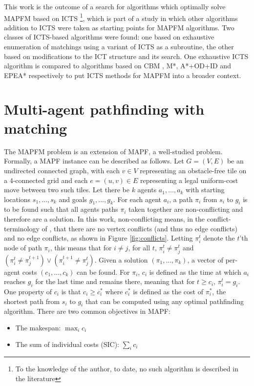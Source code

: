 \documentclass[english,10pt]{article}
\begin{document}
	This work is the outcome of a search for algorithms which optimally solve MAPFM based on ICTS \footnote{To the knowledge of the author, to date, no such algorithm is described in the literature}, which is part of a study in which other algorithms addition to ICTS were taken as starting points for MAPFM algorithms. Two classes of ICTS-based algorithms were found: one based on exhaustive enumeration of matchings using a variant of ICTS as a subroutine, the other based on modifications to the ICT structure and its search. One exhaustive ICTS algorithm is compared to algorithms based on CBM \cite{ma2016}, M*\cite{wagner2011}, A*+OD+ID\cite{standley2010} and EPEA*\cite{goldenberg2014} respectively to put ICTS methods for MAPFM into a broader context.
	
	\section{Multi-agent pathfinding with matching} %
	\label{mapfm}
	The MAPFM problem is an extension of MAPF, a well-studied problem. Formally, a MAPF instance can be described as follows. Let $G = (V,E)$ be an undirected connected graph, with each $v\in V$ representing an obstacle-free tile on a 4-connected grid and each $e = (u,v)\in E$ representing a legal uniform-cost move between two such tiles. Let there be $k$ agents $a_1,\ldots,a_k$ with starting locations $s_1,\ldots,s_k$ and goals $g_1,\ldots,g_k$. For each agent $a_i$, a path $\pi_i$ from $s_i$ to $g_i$ is to be found such that all agents paths $\pi_i$ taken together are non-conflicting and therefore are a solution. In this work, non-conflicting means, in the conflict-terminology of \cite{stern2019}, that there are no vertex conflicts (and thus no edge conflicts) and no edge conflicts, as shown in Figure \ref{fig:conflicts}. Letting $\pi_i^t$ denote the $t$'th node of path $\pi_i$, this means that for $i\neq j$, for all $t$, $\pi_i^t\neq \pi_j^t$ and $(\pi_i^t \neq \pi_j^{t + 1})\lor(\pi_i^{t+1} \neq \pi_j^t)$. Given a solution $(\pi_1,\ldots,\pi_k)$, a vector of per-agent costs $(c_1,\ldots,c_k)$ can be found. For $\pi_i$, $c_i$ is defined as the time at which $a_i$ reaches $g_i$ for the last time and remains there, meaning that for $t \geq c_i$, $\pi_i^{t} = g_i$. One property of $c_i$ is that $c_i \geq c^*_i$ where $c^*_i$ is defined as the cost of $\pi^*_i$, the shortest path from $s_i$ to $g_i$ that can be computed using any optimal pathfinding algorithm. There are two common objectives in MAPF:
	\begin{itemize}
		\item The makespan: $\max_{i} c_i$
		\item The sum of individual costs (SIC): $\sum_i c_i$
	\end{itemize}
\end{document}
